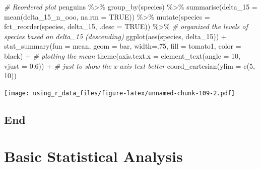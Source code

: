 \documentclass[
]{book}
\newenvironment{Shaded}{\begin{snugshade}}{\end{snugshade}}
\newcommand{\AttributeTok}[1]{\textcolor[rgb]{0.77,0.63,0.00}{#1}}
\newcommand{\CommentTok}[1]{\textcolor[rgb]{0.56,0.35,0.01}{\textit{#1}}}
\newcommand{\ConstantTok}[1]{\textcolor[rgb]{0.00,0.00,0.00}{#1}}
\newcommand{\DecValTok}[1]{\textcolor[rgb]{0.00,0.00,0.81}{#1}}
\newcommand{\FloatTok}[1]{\textcolor[rgb]{0.00,0.00,0.81}{#1}}
\newcommand{\FunctionTok}[1]{\textcolor[rgb]{0.00,0.00,0.00}{#1}}
\newcommand{\NormalTok}[1]{#1}
\newcommand{\SpecialCharTok}[1]{\textcolor[rgb]{0.00,0.00,0.00}{#1}}
\newcommand{\StringTok}[1]{\textcolor[rgb]{0.31,0.60,0.02}{#1}}
\begin{document}
\begin{Shaded}
\begin{Highlighting}[]
\CommentTok{\# Reordered plot}
\NormalTok{penguins }\SpecialCharTok{\%\textgreater{}\%} 
  \FunctionTok{group\_by}\NormalTok{(species) }\SpecialCharTok{\%\textgreater{}\%} 
  \FunctionTok{summarise}\NormalTok{(}\AttributeTok{delta\_15 =} \FunctionTok{mean}\NormalTok{(delta\_15\_n\_ooo, }\AttributeTok{na.rm =} \ConstantTok{TRUE}\NormalTok{)) }\SpecialCharTok{\%\textgreater{}\%} 
  \FunctionTok{mutate}\NormalTok{(}\AttributeTok{species =} \FunctionTok{fct\_reorder}\NormalTok{(species, delta\_15, }\AttributeTok{.desc =} \ConstantTok{TRUE}\NormalTok{)) }\SpecialCharTok{\%\textgreater{}\%}  \CommentTok{\# organized the levels of species based on delta\_15 (descending)}
  \FunctionTok{ggplot}\NormalTok{(}\FunctionTok{aes}\NormalTok{(species, delta\_15)) }\SpecialCharTok{+}
  \FunctionTok{stat\_summary}\NormalTok{(}\AttributeTok{fun =}\NormalTok{ mean, }\AttributeTok{geom =} \StringTok{\textquotesingle{}bar\textquotesingle{}}\NormalTok{, }\AttributeTok{width=}\NormalTok{.}\DecValTok{75}\NormalTok{, }\AttributeTok{fill =} \StringTok{\textquotesingle{}tomato1\textquotesingle{}}\NormalTok{, }\AttributeTok{color =} \StringTok{\textquotesingle{}black\textquotesingle{}}\NormalTok{) }\SpecialCharTok{+}  \CommentTok{\# plotting the mean}
  \FunctionTok{theme}\NormalTok{(}\AttributeTok{axis.text.x =} \FunctionTok{element\_text}\NormalTok{(}\AttributeTok{angle =} \DecValTok{10}\NormalTok{, }\AttributeTok{vjust =} \FloatTok{0.6}\NormalTok{)) }\SpecialCharTok{+} \CommentTok{\# just to show the x{-}axis text better}
  \FunctionTok{coord\_cartesian}\NormalTok{(}\AttributeTok{ylim =} \FunctionTok{c}\NormalTok{(}\DecValTok{5}\NormalTok{, }\DecValTok{10}\NormalTok{))}
\end{Highlighting}
\end{Shaded}

\texttt{[image: using\_r\_data\_files/figure-latex/unnamed-chunk-109-2.pdf]}

\hypertarget{end-1}{%
\section{End}\label{end-1}}

\hypertarget{basic-statistical-analysis}{%
\chapter{Basic Statistical Analysis}\label{basic-statistical-analysis}}
\end{document}
